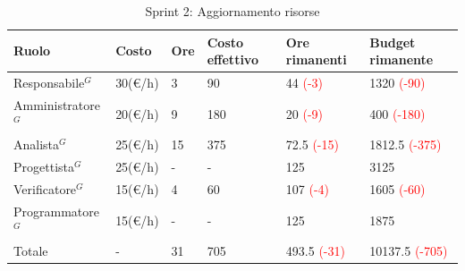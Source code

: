 \begin{table}[H]
	\centering
	\begin{tabular}{|p{}|p{}|p{}|p{}|p{}|p{}|}
		\hline
		\rowcolor{gray!25}
		Ruolo & Costo & Ore & Costo \newline effettivo & Ore \newline rimanenti & Budget \newline rimanente \\ \hline
		Responsabile$^G$   & 30(€/h) & 3 & 90 & 44 \textcolor{red}{(-3)} & 1320 \textcolor{red}{(-90)} \\ \hline
		Amministratore$^G$ & 20(€/h) & 9 & 180 & 20 \textcolor{red}{(-9)} & 400 \textcolor{red}{(-180)} \\ \hline
		Analista$^G$       & 25(€/h) & 15 & 375 & 72.5 \textcolor{red}{(-15)} & 1812.5 \textcolor{red}{(-375)} \\ \hline
		Progettista$^G$    & 25(€/h) & - & - & 125 & 3125 \\ \hline
		Verificatore$^G$   & 15(€/h) & 4 & 60 & 107 \textcolor{red}{(-4)} & 1605 \textcolor{red}{(-60)} \\ \hline
		Programmatore$^G$  & 15(€/h) & - & - & 125 & 1875 \\ \hline
		Totale         & - & 31 & 705 & 493.5 \textcolor{red}{(-31)} & 10137.5 \newline \textcolor{red}{(-705)} \\ \hline
	\end{tabular}
	\caption{Sprint 2: Aggiornamento risorse}
\end{table}
